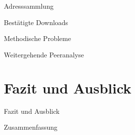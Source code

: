 \documentclass[dvipsnames]{beamer} %
\begin{document}
	\begin{frame}{Adresssammlung}
	\end{frame}

	\begin{frame}{Bestätigte Downloads}
	\end{frame}

	\begin{frame}{Methodische Probleme}
	\end{frame}

	\begin{frame}{Weitergehende Peeranalyse}
	\end{frame}

	\section{Fazit und Ausblick}
	\begin{frame}{Fazit und Ausblick}
	\end{frame}

	\begin{frame}{Zusammenfassung}
		\tableofcontents
	\end{frame}
\end{document}
